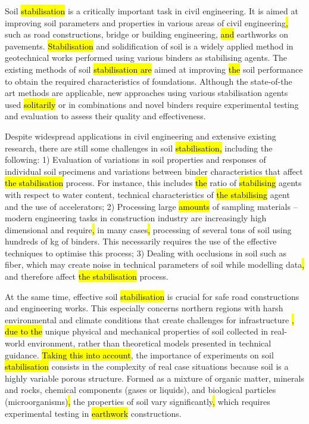 \documentclass[eprint,
]{actapoly}
\begin{document}
Soil \hl{stabilisation} is a critically important task in civil engineering. It is aimed at improving soil parameters and properties in various areas of civil engineering\hl{, }such as road constructions, bridge or building engineering, \hl{and} earthworks on pavements. \hl{Stabilisation} and solidification of soil is a widely applied method in geotechnical works performed using various binders as stabilising agents. The existing methods of soil \hl{stabilisation are} aimed at improving \hl{the} soil performance to obtain the required characteristics of foundations. Although the state-of-the art methods are applicable, new approaches using various stabilisation agents used \hl{solitarily} or in combinations and novel binders require experimental testing and evaluation to assess their quality and effectiveness. 

Despite widespread applications in civil engineering and extensive existing research, there are still some challenges in soil \hl{stabilisation,} including the following: 1) Evaluation of variations in soil properties and responses of individual soil specimens and variations between binder characteristics that affect \hl{the stabilisation} process. For instance, this includes \hl{the} ratio of \hl{stabilising} agents with respect to water content, technical characteristics of \hl{the stabilising} agent and the use of accelerators; 2) Processing large \hl{amounts} of sampling materials – modern engineering tasks in construction industry are increasingly high dimensional and require\hl{, }in many cases\hl{, }processing of several tons of soil using hundreds of kg of binders. This necessarily requires the use of the effective techniques to optimise this process; 3) Dealing with occlusions in soil such as fiber, which may create noise in technical parameters of soil while modelling data\hl{, }and therefore affect \hl{the stabilisation} process. 

At the same time, effective soil \hl{stabilisation} is crucial for safe road constructions and engineering works. This especially concerns northern regions with harsh environmental and climate conditions that create challenges for infrastructure \citep{Dahlinetal1999,ROTHHAMEL2022100735,Lindh2004,VESTIN2018146,Lemenkov2021a,Lemenkov2021b,Eigenbrod}\hl{, due to the} unique physical and mechanical properties of soil collected in real-world environment, rather than theoretical models presented in technical guidance. \hl{Taking this into account}, the importance of experiments on soil \hl{stabilisation} consists in the complexity of real case situations because soil is a highly variable porous structure. Formed as a mixture of organic matter, minerals and rocks, chemical components (gases or liquids), and biological particles (microorganisms)\hl{, }the properties of soil vary significantly\hl{, }which requires experimental testing in \hl{earthwork} constructions. 
\end{document}
